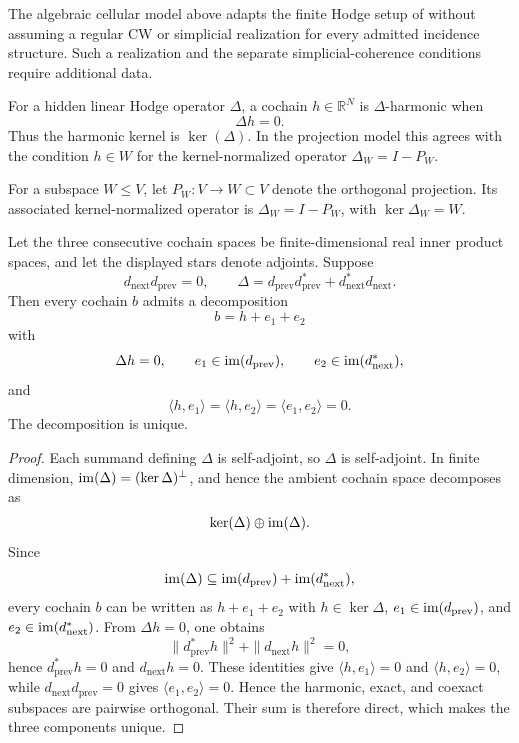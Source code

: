 The algebraic cellular model above adapts the finite Hodge setup of
\cite{hansenGhrist2018sheaves} without assuming a regular CW or simplicial
realization for every admitted incidence structure. Such a realization and
the separate simplicial-coherence conditions require additional data.

\begin{definition}\label{def:matrix-harmonicity}
  For a hidden linear Hodge operator \(\Delta\), a cochain
  \(h\in\mathbb R^N\)
  is \(\Delta\)-harmonic when
  \[
    \Delta h=0.
  \]
  Thus the harmonic kernel is \(\ker(\Delta)\). In the projection model this
  agrees with the condition \(h\in W\) for the kernel-normalized operator
  \(\Delta_W=I-P_W\).
\end{definition}

\begin{definition}\label{def:projection-laplacian}
  For a subspace \(W\le V\), let \(P_W:V\to W\subset V\) denote the
  orthogonal projection. Its associated kernel-normalized operator is
  \(\Delta_W=I-P_W\), with \(\ker\Delta_W=W\).
\end{definition}

\begin{proposition}\label{prop:hodge-decomposition}
  Let the three consecutive cochain spaces be finite-dimensional real inner
  product spaces, and let the displayed stars denote adjoints. Suppose
  \[
    d_{\mathrm{next}}d_{\mathrm{prev}}=0,
    \qquad
    \Delta=d_{\mathrm{prev}}d_{\mathrm{prev}}^\ast
      +d_{\mathrm{next}}^\ast d_{\mathrm{next}} .
  \]
  Then every cochain \(b\) admits a decomposition
  \[
    b=h+e_1+e_2
  \]
  with
  \[
    \Delta h=0,\qquad
    e_1\in\operatorname{im}(d_{\mathrm{prev}}),\qquad
    e_2\in\operatorname{im}(d_{\mathrm{next}}^\ast),
  \]
  and
  \[
    \langle h,e_1\rangle=\langle h,e_2\rangle=\langle e_1,e_2\rangle=0.
  \]
  The decomposition is unique.
\end{proposition}

\begin{proof}
  Each summand defining \(\Delta\) is self-adjoint, so \(\Delta\) is
  self-adjoint. In finite dimension,
  \(\operatorname{im}(\Delta)=(\ker\Delta)^\perp\), and hence the ambient cochain
  space decomposes as
  \[
    \ker(\Delta)\oplus\operatorname{im}(\Delta).
  \]
  Since
  \[
    \operatorname{im}(\Delta)
    \subseteq
    \operatorname{im}(d_{\mathrm{prev}})+\operatorname{im}(d_{\mathrm{next}}^\ast),
  \]
  every cochain \(b\) can be written as \(h+e_1+e_2\) with \(h\in\ker\Delta\),
  \(e_1\in\operatorname{im}(d_{\mathrm{prev}})\), and
  \(e_2\in\operatorname{im}(d_{\mathrm{next}}^\ast)\). From \(\Delta h=0\), one obtains
  \[
    \|d_{\mathrm{prev}}^\ast h\|^2+\|d_{\mathrm{next}}h\|^2=0,
  \]
  hence \(d_{\mathrm{prev}}^\ast h=0\) and \(d_{\mathrm{next}}h=0\). These
  identities give \(\langle h,e_1\rangle=0\) and
  \(\langle h,e_2\rangle=0\), while \(d_{\mathrm{next}}d_{\mathrm{prev}}=0\)
  gives \(\langle e_1,e_2\rangle=0\). Hence the harmonic, exact, and
  coexact subspaces are pairwise orthogonal. Their sum is therefore direct,
  which makes the three components unique.
\end{proof}

